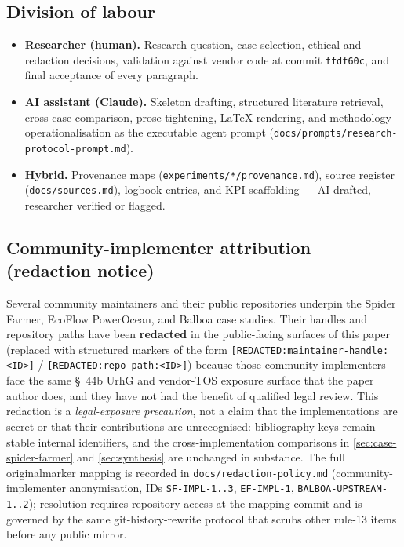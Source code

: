 \documentclass[11pt,a4paper]{article}
\begin{document}
\subsection{Division of labour}
\label{sec:ai-disclosure-division}
\begin{itemize}
  \item \textbf{Researcher (human).} Research question, case selection,
        ethical and redaction decisions, validation against vendor code
        at commit \texttt{ffdf60c}, and final acceptance of every
        paragraph.
  \item \textbf{AI assistant (Claude).} Skeleton drafting, structured
        literature retrieval, cross-case comparison, prose tightening,
        LaTeX rendering, and methodology operationalisation as the
        executable agent prompt
        (\texttt{docs/prompts/research-protocol-prompt.md}).
  \item \textbf{Hybrid.} Provenance maps
        (\texttt{experiments/*/provenance.md}), source register
        (\texttt{docs/sources.md}), logbook entries, and KPI scaffolding
        --- AI drafted, researcher verified or flagged.
\end{itemize}

\subsection{Community-implementer attribution (redaction notice)}
\label{sec:ai-disclosure-implementer-redaction}
Several community maintainers and their public repositories underpin
the Spider Farmer, EcoFlow PowerOcean, and Balboa case studies. Their
handles and repository paths have been \textbf{redacted} in the
public-facing surfaces of this paper (replaced with structured markers
of the form \texttt{[REDACTED:maintainer-handle:\textless ID\textgreater]} /
\texttt{[REDACTED:repo-path:\textless ID\textgreater]}) because those
community implementers face the same \S~44b UrhG and vendor-TOS
exposure surface that the paper author does, and they have not had the
benefit of qualified legal review. This redaction is a
\emph{legal-exposure precaution}, not a claim that the implementations
are secret or that their contributions are unrecognised: bibliography
keys remain stable internal identifiers, and the cross-implementation
comparisons in \cref{sec:case-spider-farmer} and \cref{sec:synthesis}
are unchanged in substance. The full original{\textrightarrow}marker
mapping is recorded in \texttt{docs/redaction-policy.md}
(community-implementer anonymisation, IDs \texttt{SF-IMPL-1..3},
\texttt{EF-IMPL-1}, \texttt{BALBOA-UPSTREAM-1..2}); resolution requires
repository access at the mapping commit and is governed by the same
git-history-rewrite protocol that scrubs other rule-13 items before any
public mirror.
\end{document}
